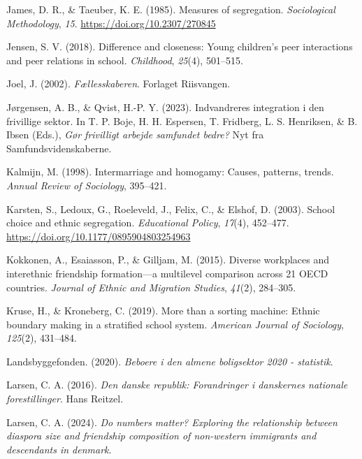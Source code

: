 \documentclass[
]{book}
\newlength{\cslhangindent}
\newenvironment{CSLReferences}[2] %
 {\begin{list}{}{%
  \setlength{\itemindent}{0pt}
  \setlength{\leftmargin}{0pt}
  \setlength{\parsep}{0pt}
  \ifodd #1
   \setlength{\leftmargin}{\cslhangindent}
   \setlength{\itemindent}{-1\cslhangindent}
  \fi
  \setlength{\itemsep}{#2\baselineskip}}}
 {\end{list}}
\begin{document}
\begin{CSLReferences}{1}{0}
James, D. R., \& Taeuber, K. E. (1985). Measures of segregation. \emph{Sociological Methodology}, \emph{15}. \url{https://doi.org/10.2307/270845}

Jensen, S. V. (2018). Difference and closeness: Young children's peer interactions and peer relations in school. \emph{Childhood}, \emph{25}(4), 501--515.

Joel, J. (2002). \emph{Fællesskaberen}. Forlaget Riisvangen.

Jørgensen, A. B., \& Qvist, H.-P. Y. (2023). Indvandreres integration i den frivillige sektor. In T. P. Boje, H. H. Espersen, T. Fridberg, L. S. Henriksen, \& B. Ibsen (Eds.), \emph{Gør frivilligt arbejde samfundet bedre?} Nyt fra Samfundsvidenskaberne.

Kalmijn, M. (1998). Intermarriage and homogamy: Causes, patterns, trends. \emph{Annual Review of Sociology}, 395--421.

Karsten, S., Ledoux, G., Roeleveld, J., Felix, C., \& Elshof, D. (2003). School choice and ethnic segregation. \emph{Educational Policy}, \emph{17}(4), 452--477. \url{https://doi.org/10.1177/0895904803254963}

Kokkonen, A., Esaiasson, P., \& Gilljam, M. (2015). Diverse workplaces and interethnic friendship formation---a multilevel comparison across 21 OECD countries. \emph{Journal of Ethnic and Migration Studies}, \emph{41}(2), 284--305.

Kruse, H., \& Kroneberg, C. (2019). More than a sorting machine: Ethnic boundary making in a stratified school system. \emph{American Journal of Sociology}, \emph{125}(2), 431--484.

Landsbyggefonden. (2020). \emph{Beboere i den almene boligsektor 2020 - statistik}.

Larsen, C. A. (2016). \emph{Den danske republik: Forandringer i danskernes nationale forestillinger}. Hans Reitzel.

Larsen, C. A. (2024). \emph{Do numbers matter? Exploring the relationship between diaspora size and friendship composition of non-western immigrants and descendants in denmark}.


\end{CSLReferences}
\end{document}
